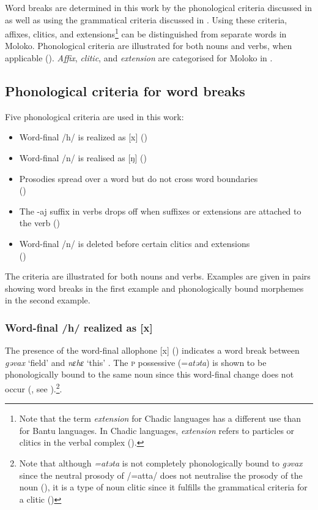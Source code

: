 \largerpage Word breaks are determined in this work by the phonological criteria discussed in  as well as using the grammatical criteria discussed in . Using these criteria, affixes, clitics, and extensions\footnote{Note that the term \textit{extension} for Chadic languages has a different use than for Bantu languages. In Chadic languages, \textit{extension} refers to particles or clitics in the verbal complex ().} can be distinguished from separate words in Moloko. Phonological criteria are illustrated for both nouns and verbs, when applicable (). \textit{Affix}, \textit{clitic}, and \textit{extension} are categorised for Moloko in .

\subsection{Phonological criteria for word breaks}\label{sec:2.6.1}
\hypertarget{RefHeading1210761525720847}{}
Five phonological criteria are used in this work:
\begin{itemize}
 \item Word-final /h/ is realized as [x] ()
 \item Word-final /n/ is realised as [ŋ] ()
 \item Prosodies spread over a word but do not cross word boundaries\\ ()
 \item The -aj suffix in verbs drops off when suffixes or extensions are attached to the verb ()
 \item Word-final /n/ is deleted before certain clitics and extensions\\ ()
\end{itemize}
The criteria are illustrated for both nouns and verbs. Examples are given in pairs showing word breaks in the first example and phonologically bound morphemes in the second example. 

\subsubsection{Word-final /h/ realized as [x]}\label{sec:2.6.1.1}

 The presence of the word-final allophone [x] (\citealt{Bow1997c}) indicates a word break between \textit{gəvax} ‘field' and \textit{nɛhɛ} ‘this' . The \textsc{p} possessive (=\textit{atəta}) is shown to be phonologically bound to the same noun  since this word-final change does not occur (\citealt{Bow1997c}, see ).\footnote{Note that although \textit{=atəta} is not completely phonologically bound to \textit{gəvax} since the neutral prosody of /=atta/ does not neutralise the prosody of the noun (), it is a type of noun clitic since it fulfills the grammatical criteria for a clitic ()}. 

